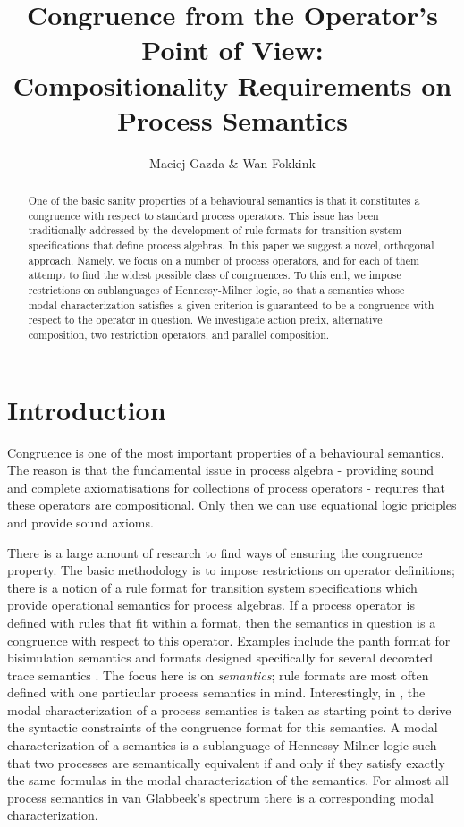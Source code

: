 \documentclass{eptcs}
\title{Congruence from the Operator's Point of View:\\
Compositionality Requirements on Process Semantics}
\author{Maciej Gazda \& Wan Fokkink
\institute{Vrije Universiteit\\
Department of Computer Science\\
De Boelelaan 1081a, 1081 HV Amsterdam, Netherlands}
\email{m.w.gazda@student.vu.nl,~wanf@cs.vu.nl}
}
\begin{document}
\maketitle
\begin{abstract}
One of the basic sanity properties of a behavioural semantics is that it constitutes
a congruence with respect to standard process operators. This 
issue has been traditionally addressed by the development of rule formats 
for transition system specifications that define process algebras. In 
this paper we suggest a novel, orthogonal approach. Namely, we focus on a 
number of process operators, and for each of them attempt to find the 
widest possible class of congruences. To this end, we impose restrictions 
on sublanguages of Hennessy-Milner logic, so that a semantics whose 
modal characterization satisfies a given criterion is guaranteed to be 
a congruence with respect to the operator in question. We investigate action 
prefix, alternative composition, two restriction operators, and parallel composition.
\end{abstract}

\section{Introduction}

Congruence is one of the most important properties of a behavioural semantics. The reason is that the fundamental issue in process algebra - providing sound and complete axiomatisations for collections of process operators - requires that these operators are compositional. Only then we can use equational logic priciples and provide sound axioms.

There is a large amount of research to find ways of ensuring the congruence property. The basic methodology is to impose restrictions on operator definitions; there is a notion of a rule format for transition system specifications which provide operational semantics for process algebras. If a process operator is defined with rules that fit within a format, then the semantics in question is a congruence with respect to this operator. Examples include the panth format for bisimulation semantics \cite{Ver95} and formats designed specifically for several decorated trace semantics \cite{BlFoGl04}. The focus here is on \textit{semantics}; rule formats are most often defined with one particular process semantics in mind. Interestingly, in \cite{BlFoGl04}, the modal characterization of a process semantics is taken as starting point to derive the syntactic constraints of the congruence format for this semantics. A modal characterization of a semantics is a sublanguage of Hennessy-Milner logic such that two processes are semantically equivalent if and only if they satisfy exactly the same formulas in the modal characterization of the semantics. For almost all process semantics in van Glabbeek's spectrum \cite{Gla01} there is a corresponding modal characterization.
 
\end{document}
